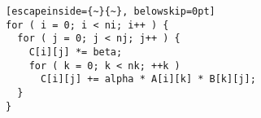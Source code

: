 \begin{lstlisting}[escapeinside={~}{~}, belowskip=0pt]
for ( i = 0; i < ni; i++ ) {
  for ( j = 0; j < nj; j++ ) {
    C[i][j] *= beta; 
    for ( k = 0; k < nk; ++k )
      C[i][j] += alpha * A[i][k] * B[k][j];
  }
}
\end{lstlisting}

